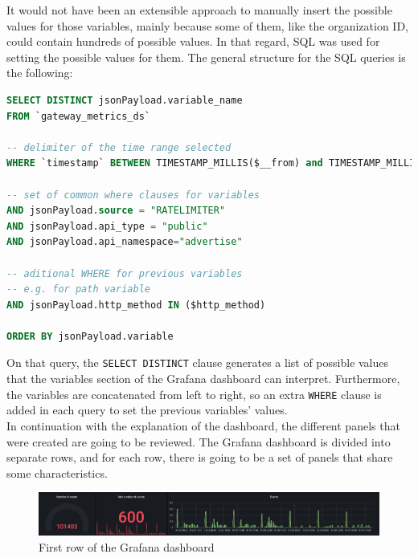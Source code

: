 \documentclass[english, 12pt, a4paper, sci, utf8, a-1b, online]{aaltothesis}
\begin{document}
It would not have been an extensible approach to manually insert the possible values for those variables, mainly because some of them, like the organization ID, could contain hundreds of possible values. In that regard, SQL was used for setting the possible values for them. The general structure for the SQL queries is the following:\\

\begin{lstlisting}[language=sql,firstnumber=1]
SELECT DISTINCT jsonPayload.variable_name
FROM `gateway_metrics_ds`

-- delimiter of the time range selected
WHERE `timestamp` BETWEEN TIMESTAMP_MILLIS($__from) and TIMESTAMP_MILLIS($__to)
  
-- set of common where clauses for variables
AND jsonPayload.source = "RATELIMITER"
AND jsonPayload.api_type = "public"
AND jsonPayload.api_namespace="advertise"

-- aditional WHERE for previous variables
-- e.g. for path variable
AND jsonPayload.http_method IN ($http_method)

ORDER BY jsonPayload.variable
\end{lstlisting}

On that query, the \texttt{SELECT DISTINCT} clause generates a list of possible values that the variables section of the Grafana dashboard can interpret. Furthermore, the variables are concatenated from left to right, so an extra \texttt{WHERE} clause is added in each query to set the previous variables' values.\\

In continuation with the explanation of the dashboard, the different panels that were created are going to be reviewed. The Grafana dashboard is divided into separate rows, and for each row, there is going to be a set of panels that share some characteristics.

\begin{figure}[h]
    \centering
    \includegraphics[scale=0.24]{src/thesis/img/technical-solution/grafana-dashboard/row-1.png}
    \caption{First row of the Grafana dashboard}
    \label{fig:grafana-row-1}
\end{figure}
\end{document}

